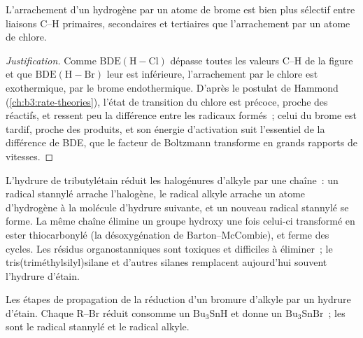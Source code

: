 \begin{proposition}\label{prop:b3:radicals-carbenes:halogenation-selectivity}
L'arrachement d'un hydrogène par un atome de brome est bien plus sélectif
entre liaisons C--H primaires, secondaires et tertiaires que l'arrachement
par un atome de chlore.
\end{proposition}

\begin{proof}[Justification]
Comme $\mathrm{BDE(H{-}Cl)}$ dépasse toutes les valeurs C--H de la figure et que $\mathrm{BDE(H{-}Br)}$ leur est inférieure,
l'arrachement par le chlore est exothermique, par le brome endothermique.
D'après le postulat de Hammond (\cref{ch:b3:rate-theories}), l'état de
transition du chlore est précoce, proche des réactifs, et ressent peu la
différence entre les radicaux formés~; celui du brome est tardif, proche
des produits, et son énergie d'activation suit l'essentiel de la
différence de BDE, que le facteur de Boltzmann transforme en grands
rapports de vitesses.
\end{proof}

L'hydrure de tributylétain réduit les halogénures d'alkyle par une chaîne~:
un radical stannylé arrache l'halogène, le radical alkyle arrache un atome
d'hydrogène à la molécule d'hydrure suivante, et un nouveau radical
stannylé se forme. La même chaîne élimine un groupe hydroxy une fois
celui-ci transformé en ester thiocarbonylé (la désoxygénation de
Barton--McCombie), et ferme des cycles. Les résidus organostanniques sont
toxiques et difficiles à éliminer~; le tris(triméthylsilyl)silane et
d'autres silanes remplacent aujourd'hui souvent l'hydrure d'étain.

\begin{omfigure}

{\small Les étapes de propagation de la réduction d'un bromure d'alkyle par
un hydrure d'étain. Chaque R--Br réduit consomme un $\mathrm{Bu_3SnH}$ et donne un $\mathrm{Bu_3SnBr}$~; les 
sont le radical stannylé et le radical alkyle.}
\end{omfigure}

